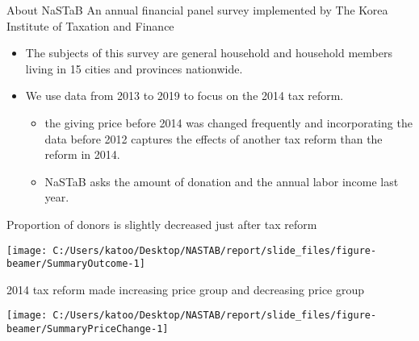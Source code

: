 \documentclass[
  ignorenonframetext,
  aspectratio=169,
]{beamer}
\providecommand{\tightlist}{%
  \setlength{\itemsep}{0pt}\setlength{\parskip}{0pt}}
\begin{document}
\begin{frame}{About NaSTaB}
\protect\hypertarget{about-nastab}{}
An annual financial panel survey implemented by The Korea Institute of Taxation and Finance

\begin{itemize}
\tightlist
\item
  The subjects of this survey are general household and household members living in 15 cities and provinces nationwide.
\item
  We use data from 2013 to 2019 to focus on the 2014 tax reform.

  \begin{itemize}
  \tightlist
  \item
    the giving price before 2014 was changed frequently and incorporating the data before 2012 captures the effects of another tax reform than the reform in 2014.
  \item
    NaSTaB asks the amount of donation and the annual labor income last year.
  \end{itemize}
\end{itemize}
\end{frame}

\begin{frame}{Proportion of donors is slightly decreased just after tax reform}
\protect\hypertarget{proportion-of-donors-is-slightly-decreased-just-after-tax-reform}{}
\begin{center}\texttt{[image: C:/Users/katoo/Desktop/NASTAB/report/slide\_files/figure-beamer/SummaryOutcome-1]} \end{center}
\end{frame}

\begin{frame}{2014 tax reform made increasing price group and decreasing price group}
\protect\hypertarget{tax-reform-made-increasing-price-group-and-decreasing-price-group}{}
\begin{center}\texttt{[image: C:/Users/katoo/Desktop/NASTAB/report/slide\_files/figure-beamer/SummaryPriceChange-1]} \end{center}
\end{frame}
\end{document}
